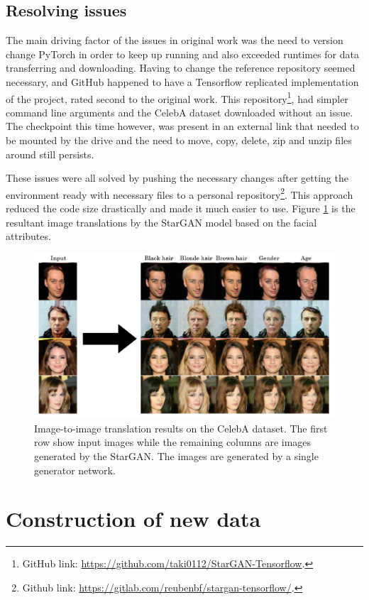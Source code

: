 \documentclass[preprint,12pt]{elsarticle}
\begin{document}
\subsection{Resolving issues}

The main driving factor of the issues in original work was the need to version change PyTorch in order to keep up running and also exceeded runtimes for data transferring and downloading. Having to change the reference repository seemed necessary, and GitHub happened to have a Tensorflow replicated implementation of the project, rated second to the original work. This repository\footnote{GitHub link: \url{https://github.com/taki0112/StarGAN-Tensorflow}.}, had simpler command line arguments and the CelebA dataset downloaded without an issue. The checkpoint this time however, was present in an external link that needed to be mounted by the drive and the need to move, copy, delete, zip and unzip files around still persists.

These issues were all solved by pushing the necessary changes after getting the environment ready with necessary files to a personal repository\footnote{Github link: \url{https://gitlab.com/reubenbf/stargan-tensorflow/}.}. This approach reduced the code size drastically and made it much easier to use. Figure \ref{fig:StarGAN} is the resultant image translations by the StarGAN model based on the facial attributes.

\begin{figure}[ht]
\centering\includegraphics[width=0.7\linewidth]{StarGAN.png}
\caption{Image-to-image translation results on the CelebA dataset. The first row show input images while the remaining columns are images generated by the StarGAN. The images are generated by a single generator network.}
\label{fig:StarGAN}
\end{figure}

\section{Construction of new data}
\label{S:4}
\end{document}
